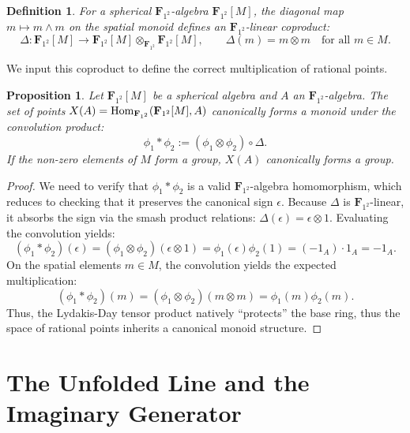 \documentclass[11pt,a4paper]{article}
\newtheorem{proposition}[theorem]{Proposition}
\newtheorem{definition}[theorem]{Definition}
\newcommand{\Ftwo}{\mathbf{F}_{1^2}}
\newcommand{\Hom}{{\rm{Hom}}}
\begin{document}
\begin{definition}
For a spherical $\Ftwo$-algebra $\Ftwo[M]$, the diagonal map $m \mapsto m \wedge m$ on the spatial monoid defines an $\Ftwo$-linear coproduct:
\begin{equation*}
\Delta: \Ftwo[M] \longrightarrow \Ftwo[M] \otimes_{\Ftwo} \Ftwo[M], \qquad \Delta(m) = m \otimes m \quad \text{for all } m \in M.
\end{equation*}
\end{definition}

We input this coproduct to define the correct multiplication of rational points.

\begin{proposition}
Let $\Ftwo[M]$ be a spherical algebra and $A$ an $\Ftwo$-algebra. The set of points $X(A) = \Hom_{\Ftwo}(\Ftwo[M], A)$ canonically forms a monoid under the convolution product:
\begin{equation}\label{conv}
\phi_1 \ast \phi_2 := (\phi_1 \otimes \phi_2) \circ \Delta.
\end{equation}
If the non-zero elements of $M$ form a group, $X(A)$ canonically forms a group.
\end{proposition}

\begin{proof}
We need to verify that $\phi_1 \ast \phi_2$ is a valid $\Ftwo$-algebra homomorphism, which reduces to checking that it preserves the canonical sign $\epsilon$. Because $\Delta$ is $\Ftwo$-linear, it absorbs the sign via the smash product relations: $\Delta(\epsilon) = \epsilon \otimes 1$. Evaluating the convolution yields:
\begin{equation*}
(\phi_1 \ast \phi_2)(\epsilon) = (\phi_1 \otimes \phi_2)(\epsilon \otimes 1) = \phi_1(\epsilon)\phi_2(1) = (-1_A) \cdot 1_A = -1_A.
\end{equation*}
On the spatial elements $m \in M$, the convolution yields the expected multiplication:
\begin{equation*}
(\phi_1 \ast \phi_2)(m) = (\phi_1 \otimes \phi_2)(m \otimes m) = \phi_1(m)\phi_2(m).
\end{equation*}
Thus, the Lydakis-Day tensor product natively ``protects'' the base ring, thus the space of rational points inherits a canonical monoid structure.
\end{proof}


\section{The Unfolded Line and the Imaginary Generator}
\end{document}
